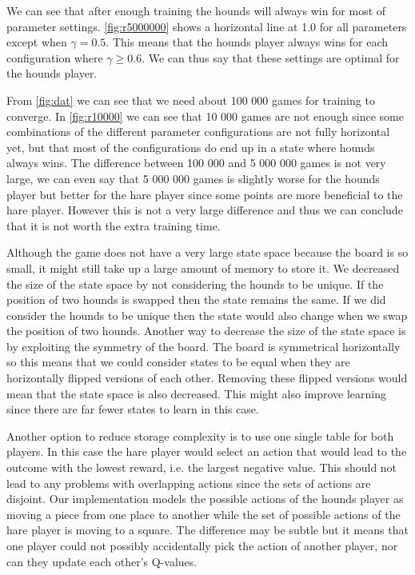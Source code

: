 We can see that after enough training the hounds will always win for most of
parameter settings. \autoref{fig:r5000000} shows a horizontal line at 1.0 for
all parameters except when $\gamma = 0.5$. This means that the hounds player
always wins for each configuration where $\gamma \geq 0.6$. We can thus say
that these settings are optimal for the hounds player.

From \autoref{fig:dat} we can see that we need about 100 000 games for training
to converge. In \autoref{fig:r10000} we can see that 10 000 games are not enough
since some combinations of the different parameter configurations are not fully
horizontal yet, but that most of the configurations do end up in a state where
hounds always wins. The difference between 100 000 and 5 000 000 games is not
very large, we can even say that 5 000 000 games is slightly worse for the
hounds player but better for the hare player since some points are more
beneficial to the hare player. However this is not a very large difference and
thus we can conclude that it is not worth the extra training time.

Although the game does not have a very large state space because the board is
so small, it might still take up a large amount of memory to store it. We
decreased the size of the state space by not considering the hounds to be
unique. If the position of two hounds is swapped then the state remains the
same. If we did consider the hounds to be unique then the state would also
change when we swap the position of two hounds. Another way to decrease the
size of the state space is by exploiting the symmetry of the board. The board
is symmetrical horizontally so this means that we could consider states to be
equal when they are horizontally flipped versions of each other. Removing these
flipped versions would mean that the state space is also decreased. This might
also improve learning since there are far fewer states to learn in this case.

Another option to reduce storage complexity is to use one single table for both
players. In this case the hare player would select an action that would lead
to the outcome with the lowest reward, i.e. the largest negative value. This
should not lead to any problems with overlapping actions since the sets of
actions are disjoint. Our implementation models the possible actions of the
hounds player as moving a piece from one place to another while the set of
possible actions of the hare player is moving to a square. The difference
may be subtle but it means that one player could not possibly accidentally
pick the action of another player, nor can they update each other's Q-values.

